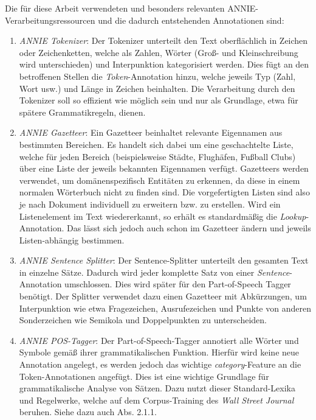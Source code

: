 \documentclass[12pt]{report}
\begin{document}
Die für diese Arbeit verwendeten und besonders relevanten ANNIE- Verarbeitungsressourcen und die dadurch entstehenden Annotationen sind: 


\begin{enumerate}
\item \textit{ANNIE Tokenizer}: Der Tokenizer unterteilt den Text oberflächlich in Zeichen oder Zeichenketten, welche als Zahlen, Wörter (Groß- und Kleinschreibung wird unterschieden) und Interpunktion kategorisiert werden. Dies fügt an den betroffenen Stellen die \textit{Token}-Annotation hinzu, welche jeweils Typ (Zahl, Wort usw.) und Länge in Zeichen beinhalten. Die Verarbeitung durch den Tokenizer soll so effizient wie möglich sein und nur als Grundlage, etwa für spätere Grammatikregeln, dienen.

\item \textit{ANNIE Gazetteer}: Ein Gazetteer beinhaltet relevante Eigennamen aus bestimmten Bereichen. Es handelt sich dabei um eine geschachtelte Liste, welche für jeden Bereich (beispielsweise Städte, Flughäfen, Fußball Clubs) über eine Liste der jeweils bekannten Eigennamen verfügt. Gazetteers werden verwendet, um domänenspezifisch Entitäten zu erkennen, da diese in einem normalen Wörterbuch nicht zu finden sind. Die vorgefertigten Listen sind also je nach Dokument individuell zu erweitern bzw. zu erstellen. Wird ein Listenelement im Text wiedererkannt, so erhält es standardmäßig die \textit{Lookup}-Annotation. Das lässt sich jedoch auch schon im Gazetteer ändern und jeweils Listen-abhängig bestimmen. 

\item \textit{ANNIE Sentence Splitter}: Der Sentence-Splitter unterteilt den gesamten Text in einzelne Sätze. Dadurch wird jeder komplette Satz von einer \textit{Sentence}-Annotation umschlossen. Dies wird später für den Part-of-Speech Tagger benötigt. Der Splitter verwendet dazu einen Gazetteer mit Abkürzungen, um Interpunktion wie etwa Fragezeichen, Ausrufezeichen und Punkte von anderen Sonderzeichen wie Semikola und Doppelpunkten zu unterscheiden. 

\item \textit{ANNIE POS-Tagger}: Der Part-of-Speech-Tagger annotiert alle Wörter und Symbole gemäß ihrer grammatikalischen Funktion. Hierfür wird keine neue Annotation angelegt, es werden jedoch das wichtige \textit{category}-Feature an die Token-Annotationen angefügt. Dies ist eine wichtige Grundlage für grammatikalische Analyse von Sätzen. Dazu nutzt dieser Standard-Lexika und Regelwerke, welche auf dem Corpus-Training des \textit{Wall Street Journal} beruhen. Siehe dazu auch Abs. 2.1.1.
\end{enumerate}
\end{document}
